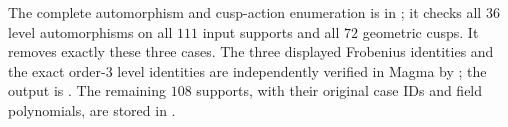 The complete automorphism and cusp-action enumeration is in
; it checks all $36$ level
automorphisms on all $111$ input supports and all $72$ geometric
cusps. It removes exactly these three cases.
The three displayed Frobenius identities and the exact order-$3$
level identities are independently verified in Magma by
; the output is
.
The remaining $108$ supports, with their original case IDs and
field polynomials, are stored in
.
